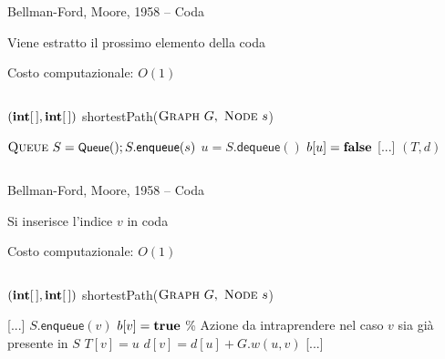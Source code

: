 \begin{frame}{Bellman-Ford, Moore, 1958 -- Coda}

\vspace{-9pt}
\begin{myboxtitle}
\BI
\item Viene estratto il prossimo elemento della coda
\item Costo computazionale: $O(1)$
\EI
\end{myboxtitle}

\vspace{-18pt}
\begin{columns}
\small
\begin{Procedure}
\caption[A]{$(\INTARRAY, \INTARRAY)$ \textsf{shortestPath}($\textsc{Graph}\ G,\ \textsc{Node}\ s$)}
$\textsc{Queue}\ S = \textsf{{\small Queue}}(); S.\textsf{enqueue}(s)$\;
{
  \alert{$u = S.\textsf{dequeue}()$}\;
  $b[u] = \FALSE$\;
  {
    {
      [...]
    }
  }
}
\Return $(T,d)$
\end{Procedure}
\end{columns}

\end{frame}

\begin{frame}{Bellman-Ford, Moore, 1958 -- Coda}

\vspace{-9pt}
\begin{myboxtitle}
\BI
\item Si inserisce l'indice $v$ in coda
\item Costo computazionale: $O(1)$
\EI
\end{myboxtitle}

\vspace{-18pt}
\begin{columns}
\small
\begin{Procedure}
\caption[A]{$(\INTARRAY, \INTARRAY)$ \textsf{shortestPath}($\textsc{Graph}\ G,\ \textsc{Node}\ s$)}
[...]\;
    {
      {
        \alert{$S.\textsf{enqueue}(v)$}\;
        $b[v] = \TRUE$\;
      }
      {
        \% Azione da intraprendere nel caso $v$ sia già presente in $S$
      }
      $T[v] = u$\;
      $d[v] = d[u] + G.w(u,v)$\;
    }
[...]\;
\end{Procedure}
\end{columns}

\end{frame}

